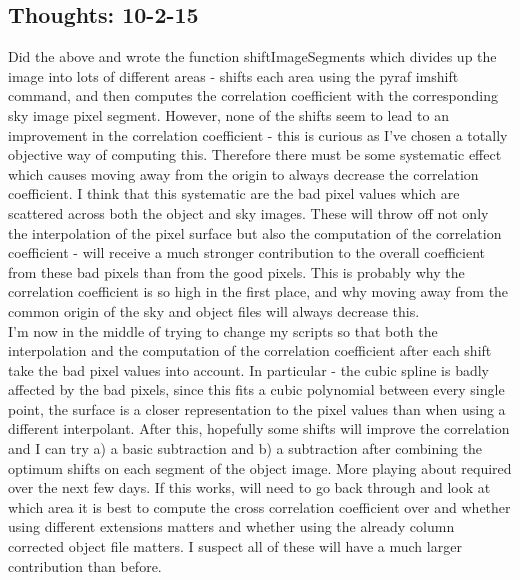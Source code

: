 \documentclass{literature}
\begin{document}
\subsection{Thoughts: 10-2-15}
Did the above and wrote the function shiftImageSegments which divides up the image into lots of different areas - shifts each area using the pyraf imshift command, and then computes the correlation coefficient with the corresponding sky image pixel segment. However, none of the shifts seem to lead to an improvement in the correlation coefficient - this is curious as I've chosen a totally objective way of computing this. Therefore there must be some systematic effect which causes moving away from the origin to always decrease the correlation coefficient. I think that this systematic are the bad pixel values which are scattered across both the object and sky images. These will throw off not only the interpolation of the pixel surface but also the computation of the correlation coefficient - will receive a much stronger contribution to the overall coefficient from these bad pixels than from the good pixels. This is probably why the correlation coefficient is so high in the first place, and why moving away from the common origin of the sky and object files will always decrease this. \\ 
I'm now in the middle of trying to change my scripts so that both the interpolation and the computation of the correlation coefficient after each shift take the bad pixel values into account. In particular - the cubic spline is badly affected by the bad pixels, since this fits a cubic polynomial between every single point, the surface is a closer representation to the pixel values than when using a different interpolant. After this, hopefully some shifts will improve the correlation and I can try a) a basic subtraction and b) a subtraction after combining the optimum shifts on each segment of the object image. More playing about required over the next few days. If this works, will need to go back through and look at which area it is best to compute the cross correlation coefficient over and whether using different extensions matters and whether using the already column corrected object file matters. I suspect all of these will have a much larger contribution than before.
\end{document}
